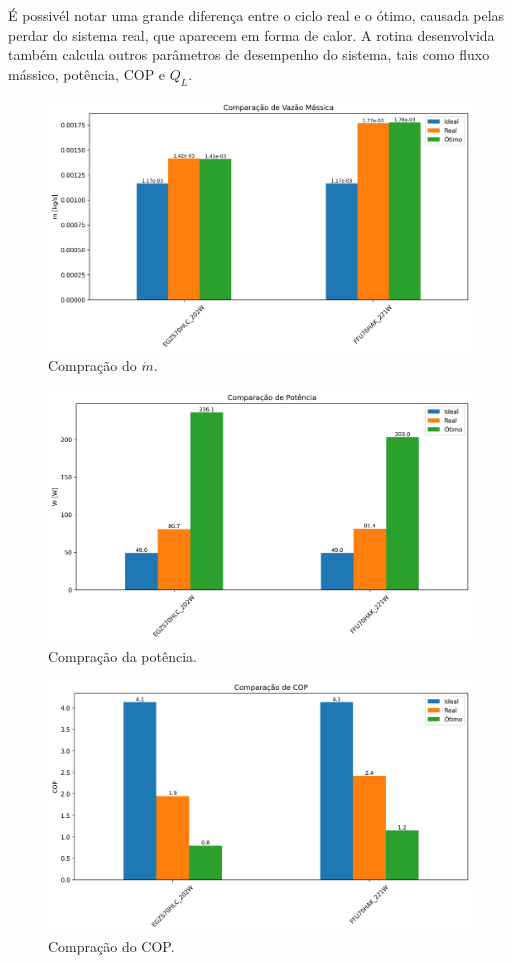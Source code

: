 É possivél notar uma grande diferença entre o ciclo real e o ótimo, causada pelas perdar do sistema real, que aparecem em forma de calor. A rotina desenvolvida também calcula outros parâmetros de desempenho do sistema, tais como fluxo mássico, potência, COP e ${Q_L}$.

\newpage

\begin{figure}[h]
    \centering
    \includegraphics[width=0.8\linewidth]{Imagens/Desenvolvimento/barras_m.png}
    \caption{Compração do $\dot{m}$.}
    \label{fig:barras fluxo massa}
\end{figure}

\begin{figure}[h]
    \centering
    \includegraphics[width=0.8\linewidth]{Imagens/Desenvolvimento/barras_W.png}
    \caption{Compração da potência.}
    \label{fig:barras W}
\end{figure}

\newpage

\begin{figure}[h]
    \centering
    \includegraphics[width=0.8\linewidth]{Imagens/Desenvolvimento/barras_COP.png}
    \caption{Compração do COP.}
    \label{fig:barras COP}
\end{figure}

